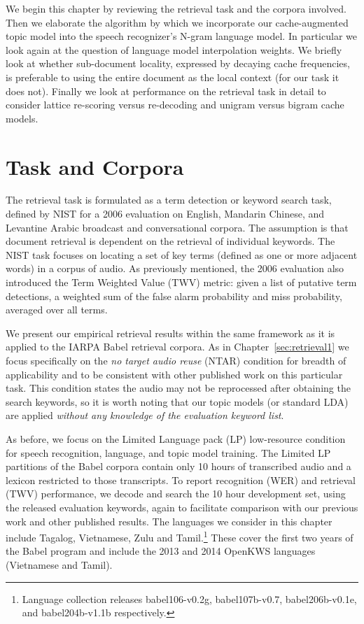We begin this chapter by reviewing the retrieval task and the corpora involved.  Then we elaborate the algorithm by which we incorporate our cache-augmented topic model into the speech recognizer's N-gram language model.  In particular we look again at the question of language model interpolation weights.  We briefly look at whether sub-document locality, expressed by decaying cache frequencies, is preferable to using the entire document as the local context (for our task it does not).  Finally we look at performance on the retrieval task in detail to consider lattice re-scoring versus re-decoding and unigram versus bigram cache models.


\section{Task and Corpora}
The retrieval task is formulated as a term detection or keyword search task, defined by NIST for a 2006 evaluation on English, Mandarin Chinese, and Levantine Arabic broadcast and conversational corpora\cite{std06eval}.   The assumption is that document retrieval is dependent on the retrieval of individual keywords.  The NIST task focuses on locating a set of key terms (defined as one or more adjacent words) in a corpus of audio.  As previously mentioned, the 2006 evaluation also introduced the Term Weighted Value (TWV) metric: given a list of putative term detections, a weighted sum of the false alarm probability and miss probability, averaged over all terms.

We present our empirical retrieval results within the same framework as it is applied to the IARPA Babel retrieval corpora.  As in Chapter~\ref{sec:retrieval1} we focus specifically on the \emph{no target audio reuse} (NTAR) condition for breadth of applicability and to be consistent with other published work on this particular task.  This condition states the audio may not be reprocessed after obtaining the search keywords, so it is worth noting that our topic models (or standard LDA) are applied \textit{without any knowledge of the evaluation keyword list}.

As before, we focus on the Limited Language pack (LP) low-resource condition for speech recognition, language, and topic model training. The Limited LP partitions of the Babel corpora contain only 10 hours of transcribed audio and a lexicon restricted to those transcripts.  To report recognition (WER) and retrieval (TWV) performance, we decode and search the 10 hour development set, using the released evaluation keywords, again to facilitate comparison with our previous work and other published results.  The languages we consider in this chapter include Tagalog, Vietnamese, Zulu and Tamil.\footnote{Language collection releases babel106-v0.2g, babel107b-v0.7, babel206b-v0.1e, and babel204b-v1.1b respectively.}  These cover the first two years of the Babel program and include the 2013 and 2014 OpenKWS languages \cite{openKWS13,openKWS14} (Vietnamese and Tamil).  

